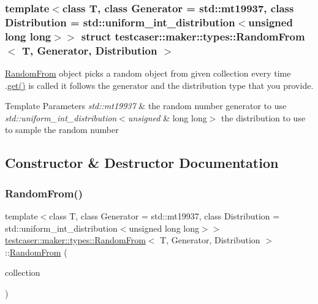 \subsubsection*{template$<$class T, class Generator = std\+::mt19937, class Distribution = std\+::uniform\+\_\+int\+\_\+distribution$<$unsigned long long$>$$>$\newline
struct testcaser\+::maker\+::types\+::\+Random\+From$<$ T, Generator, Distribution $>$}

\hyperlink{structtestcaser_1_1maker_1_1types_1_1RandomFrom}{Random\+From} object picks a random object from given collection every time .\hyperlink{structtestcaser_1_1maker_1_1types_1_1RandomFrom_a6f72354c54f49a18de70b057a3b0f04b}{get()} is called it follows the generator and the distribution type that you provide. 


\begin{DoxyTemplParams}{Template Parameters}
{\em std\+::mt19937} & the random number generator to use \\
\hline
{\em std\+::uniform\+\_\+int\+\_\+distribution$<$unsigned} & long long$>$ the distribution to use to sample the random number \\
\hline
\end{DoxyTemplParams}


\subsection{Constructor \& Destructor Documentation}
\mbox{\label{structtestcaser_1_1maker_1_1types_1_1RandomFrom_a12bdbf6714da58c108d8282bc1e002cf}} 
\subsubsection{\texorpdfstring{Random\+From()}{RandomFrom()}}
{\footnotesize\ttfamily template$<$class T, class Generator = std\+::mt19937, class Distribution = std\+::uniform\+\_\+int\+\_\+distribution$<$unsigned long long$>$$>$ \\
\hyperlink{structtestcaser_1_1maker_1_1types_1_1RandomFrom}{testcaser\+::maker\+::types\+::\+Random\+From}$<$ T, Generator, Distribution $>$\+::\hyperlink{structtestcaser_1_1maker_1_1types_1_1RandomFrom}{Random\+From} (\begin{DoxyParamCaption}\item[{std\+::vector$<$ T $>$}]{collection }\end{DoxyParamCaption})\hspace{0.3cm}{\ttfamily [inline]}}



